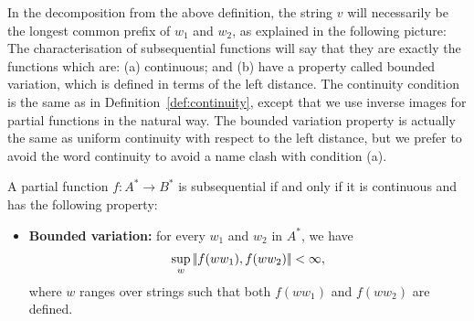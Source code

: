 In the decomposition from the above definition, the string $v$ will necessarily be the longest common prefix of $w_1$ and $w_2$, as explained in the following picture:
The characterisation of subsequential functions will say that they are exactly the functions which are: (a) continuous; and (b) have a property called bounded variation, which is defined in terms of the left distance. The continuity condition is the same as in Definition~\ref{def:continuity}, except that we use inverse images for partial functions in the natural way. The bounded variation property is actually the same as uniform continuity with respect to the left distance, but we prefer to avoid the word continuity to avoid a name clash with condition (a).


\begin{theorem}[Choffrut]\label{thm:subsequential-functions}
        A partial function $f : A^* \to B^*$ is subsequential if and only if it is continuous and has the following  property: 
        \begin{itemize}
            \item \textbf{Bounded variation:}  for every $w_1$ and $w_2$ in $A^*$, we have 
            \begin{align*}
            \sup_{w} |\!|  f(ww_1), f(ww_2) |\!| < \infty,
        \end{align*}
        where  $w$ ranges over strings such that both $f(w w_1)$ and $f(ww_2)$ are defined.
        \end{itemize}
\end{theorem}

